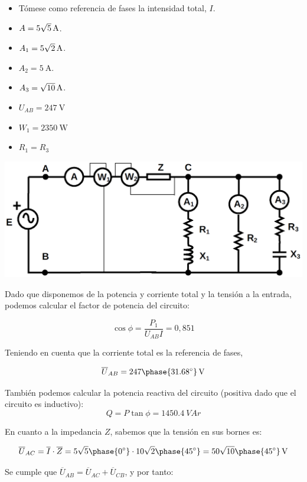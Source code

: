 \documentclass[12pt]{article}
\begin{document}
\begin{enumerate}[resume]
\begin{itemize}
\item Tómese como referencia de fases la intensidad total, $I$.
\item $A = \SI[parse-numbers = false]{5\sqrt{5}}{\ampere}$.
\item $A_1 = \SI[parse-numbers = false]{5\sqrt{2}}{\ampere}$.
\item $A_2 = \SI{5}{\ampere}$.
\item $A_3 = \SI[parse-numbers = false]{\sqrt{10}}{\ampere}$.
\item $U_{AB} = \SI{247}{\volt}$
\item $W_1 = \SI{2350}{\watt}$
\item $R_1 = R_3$

\end{itemize}

\begin{center}
  \includegraphics[height=0.2\textheight]{figs/problema10}
\end{center}
Dado que disponemos de la potencia y corriente total y la tensión a
la entrada, podemos calcular el factor de potencia del circuito:

\[
\cos \phi = \frac{P_1}{U_{AB} I} = 0,851
\]

Teniendo en cuenta que la corriente total es la referencia de fases, 

\[
\overline{U}_{AB} = \SI[parse-numbers=false]{247 \phase{\ang{31.68}}}{\V}
\]

También podemos calcular la potencia reactiva del circuito
(positiva dado que el circuito es inductivo):
\[
Q = P \tan \phi = \SI{1450.4}{VA}r
\]


En cuanto a la impedancia $Z$, sabemos que la tensión en sus bornes
es:

\[
\overline{U}_{AC} = \overline{I} \cdot \overline{Z} =
5\sqrt{5}\phase{\ang{0}} \cdot 10\sqrt{2}\phase{\ang{45}} = \SI[parse-numbers=false]{50\sqrt{10}\phase{\ang{45}}}{\V}
\]

Se cumple que $\overline{U}_{AB} = \overline{U}_{AC} +
\overline{U}_{CB}$, y por tanto:


\end{enumerate}
\end{document}
